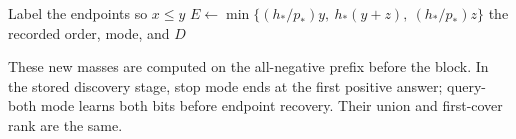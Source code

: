 ﻿\begin{algorithm}[H]
\caption{Rational choice between stopping and querying both endpoints}
\label{alg:block-mode}
Label the endpoints so $x\le y$\;
$E\gets\min\{(h_*/p_*)y,\ h_*(y+z),\ (h_*/p_*)z\}$\;
\KwRet the recorded order, mode, and $D$\;
\end{algorithm}

These new masses are computed on the all-negative prefix before the
block. In the stored discovery stage, stop mode ends at the first
positive answer; query-both mode learns both bits before endpoint
recovery. Their union and first-cover rank are the same.

